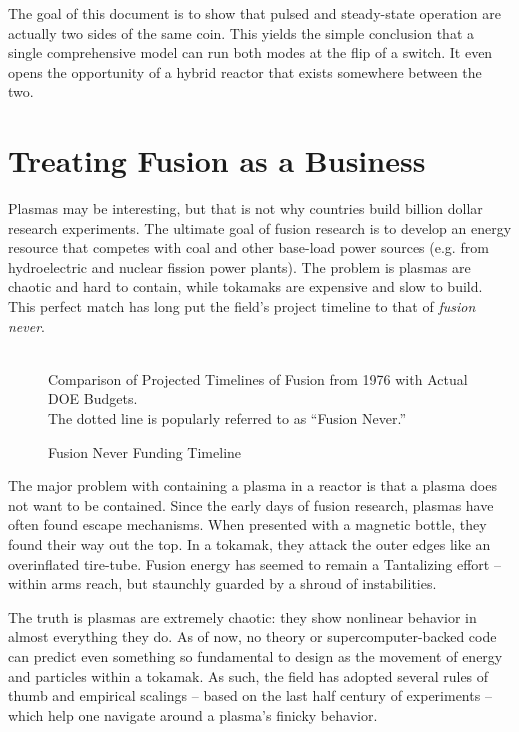 The goal of this document is to show that pulsed and steady-state operation are actually two sides of the same coin. This yields the simple conclusion that a single comprehensive model can run both modes at the flip of a switch. It even opens the opportunity of a hybrid reactor that exists somewhere between the two.

\section{Treating Fusion as a Business}

Plasmas may be interesting, but that is not why countries build billion dollar research experiments. The ultimate goal of fusion research is to develop an energy resource that competes with coal and other base-load power sources (e.g. from hydroelectric and nuclear fission power plants). The problem is plasmas are chaotic and hard to contain, while tokamaks are expensive and slow to build. This perfect match has long put the field's project timeline to that of \emph{fusion never}. \cite{fusionfunding}

\begin{figure}[h]
	\centering
	\begin{adjustbox}{width=0.75\textwidth}
		
	\end{adjustbox}
	\caption{Fusion Never Funding Timeline} ~\\
	\small Comparison of Projected Timelines of Fusion from 1976 with Actual DOE Budgets. \cite{doe87, doe19} \\ The dotted line is popularly referred to as  ``Fusion Never.'' \cite{fusionnever}
\end{figure}

The major problem with containing a plasma in a reactor is that a plasma does not want to be contained. Since the early days of fusion research, plasmas have often found escape mechanisms. When presented with a magnetic bottle, they found their way out the top. In a tokamak, they attack the outer edges like an overinflated tire-tube. Fusion energy has seemed to remain a Tantalizing effort -- within arms reach, but staunchly guarded by a shroud of instabilities.

The truth is plasmas are extremely chaotic: they show nonlinear behavior in almost everything they do. As of now, no theory or supercomputer-backed code can predict even something so fundamental to design as the movement of energy and particles within a tokamak. As such, the field has adopted several rules of thumb and empirical scalings -- based on the last half century of experiments -- which help one navigate around a plasma's finicky behavior.

